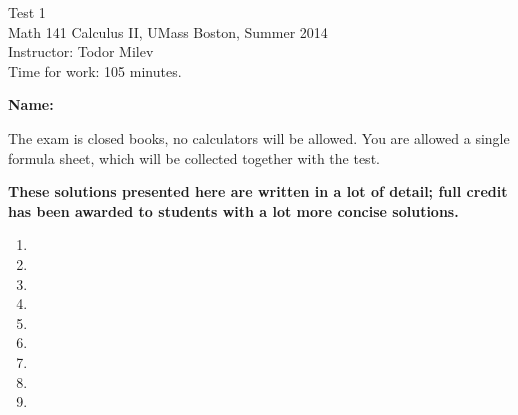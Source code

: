 \documentclass{article}
\begin{document}
\begin{center}
\Large
Test 1\\\normalsize Math 141 Calculus II, UMass Boston, Summer 2014 \\  Instructor: Todor Milev\\ Time for work: 105 minutes.
\end{center}


\noindent \textbf{Name:} \hfill{~}

\noindent The exam is closed books, no calculators will be allowed. You are allowed a single formula sheet, which will be collected together with the test. 

\textbf{These solutions presented here are written in a lot of detail; full credit has been awarded to students with a lot more concise solutions.}

\begin{enumerate}
\item 
\item 

\item 

\item 


\item 


\item 

\item 


\item 

\item







\end{enumerate}
\end{document}
